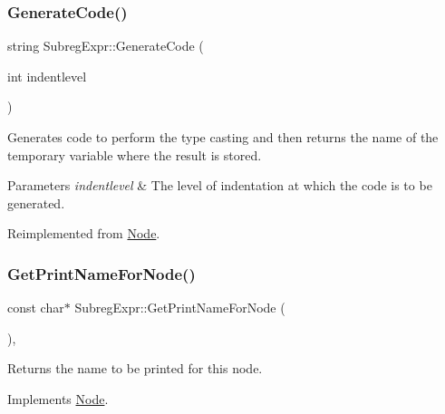 \mbox{\label{class_subreg_expr_a4604758277a1e78e9b5f9bb4cdc7b2cd}} 
\subsubsection{\texorpdfstring{Generate\+Code()}{GenerateCode()}}
{\footnotesize\ttfamily string Subreg\+Expr\+::\+Generate\+Code (\begin{DoxyParamCaption}\item[{int}]{indentlevel }\end{DoxyParamCaption})\hspace{0.3cm}{\ttfamily [virtual]}}

Generates code to perform the type casting and then returns the name of the temporary variable where the result is stored. 
\begin{DoxyParams}{Parameters}
{\em indentlevel} & The level of indentation at which the code is to be generated. \\
\hline
\end{DoxyParams}


Reimplemented from \hyperlink{class_node_acb60e526730e8436056375a3055c2c32}{Node}.

\mbox{\label{class_subreg_expr_a21bea1838b9fe850b49d6a3a31dc99bc}} 
\subsubsection{\texorpdfstring{Get\+Print\+Name\+For\+Node()}{GetPrintNameForNode()}}
{\footnotesize\ttfamily const char$\ast$ Subreg\+Expr\+::\+Get\+Print\+Name\+For\+Node (\begin{DoxyParamCaption}{ }\end{DoxyParamCaption})\hspace{0.3cm}{\ttfamily [inline]}, {\ttfamily [virtual]}}

Returns the name to be printed for this node. 

Implements \hyperlink{class_node_a56e29657306ffb004d69c6929ae44269}{Node}.

\mbox{\label{class_subreg_expr_a958cb7d3d07cb2b8f1b15759c03fda9d}} 
